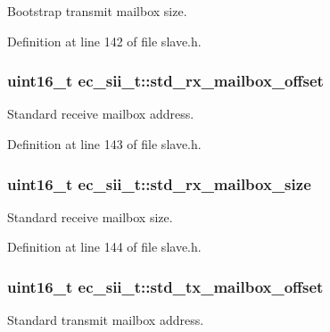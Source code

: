 Bootstrap transmit mailbox size. 



Definition at line 142 of file slave.\-h.

\subsubsection[{std\-\_\-rx\-\_\-mailbox\-\_\-offset}]{\setlength{\rightskip}{0pt plus 5cm}uint16\-\_\-t ec\-\_\-sii\-\_\-t\-::std\-\_\-rx\-\_\-mailbox\-\_\-offset}\label{structec__sii__t_a0172b2d04dcbc56d75abc1efa76dd392}


Standard receive mailbox address. 



Definition at line 143 of file slave.\-h.

\subsubsection[{std\-\_\-rx\-\_\-mailbox\-\_\-size}]{\setlength{\rightskip}{0pt plus 5cm}uint16\-\_\-t ec\-\_\-sii\-\_\-t\-::std\-\_\-rx\-\_\-mailbox\-\_\-size}\label{structec__sii__t_abcdfe5aa59f2fcbf9deaa4d1a9c954fe}


Standard receive mailbox size. 



Definition at line 144 of file slave.\-h.

\subsubsection[{std\-\_\-tx\-\_\-mailbox\-\_\-offset}]{\setlength{\rightskip}{0pt plus 5cm}uint16\-\_\-t ec\-\_\-sii\-\_\-t\-::std\-\_\-tx\-\_\-mailbox\-\_\-offset}\label{structec__sii__t_aa5c8f21c36995d272bc456266e035815}


Standard transmit mailbox address. 




